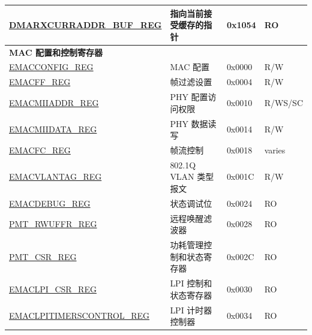 \begin{longtable}{ |m{6cm} |m{5.3cm} | m{2cm} | m{2.2cm} | }
\hyperref[regdesc:DMARXCURRADDRBUFREG]{DMARXCURRADDR\_BUF\_REG} & 指向当前接受缓存的指针& 0x1054 & RO \\ \hline
\multicolumn{4}{|l|}{\textbf{MAC 配置和控制寄存器}} \\ \hline
\hyperref[regdesc:EMACCONFIGREG]{EMACCONFIG\_REG} & MAC 配置& 0x0000 & R/W \\ \hline
\hyperref[regdesc:EMACFFREG]{EMACFF\_REG} & 帧过滤设置 & 0x0004 & R/W \\ \hline
\hyperref[regdesc:EMACMIIADDRREG]{EMACMIIADDR\_REG} & PHY 配置访问权限  & 0x0010 & R/WS/SC \\ \hline
\hyperref[regdesc:EMACMIIDATAREG]{EMACMIIDATA\_REG} & PHY 数据读写 & 0x0014 & R/W \\ \hline
\hyperref[regdesc:EMACFLOWCONTROLREG]{EMACFC\_REG} & 帧流控制& 0x0018 & varies \\ \hline
\hyperref[regdesc:EMACVLANTAGREG]{EMACVLANTAG\_REG} & 802.1Q VLAN 类型报文 & 0x001C & R/W \\ \hline

\hyperref[regdesc:EMACDEBUGREG]{EMACDEBUG\_REG} & 状态调试位& 0x0024 & RO \\ \hline
\hyperref[regdesc:PMTRWUFFRREG]{PMT\_RWUFFR\_REG} & 远程唤醒滤波器 & 0x0028 & RO \\ \hline
\hyperref[regdesc:PMTCSRREG]{PMT\_CSR\_REG} & 功耗管理控制和状态寄存器 & 0x002C & RO \\ \hline
\hyperref[regdesc:EMACLPICSRREG]{EMACLPI\_CSR\_REG} & LPI 控制和状态寄存器 & 0x0030 & RO \\ \hline
\hyperref[regdesc:EMACLPITIMERSCONTROLREG]{EMACLPITIMERSCONTROL\_REG} & LPI 计时器控制器 & 0x0034 & RO \\ \hline


\end{longtable}
